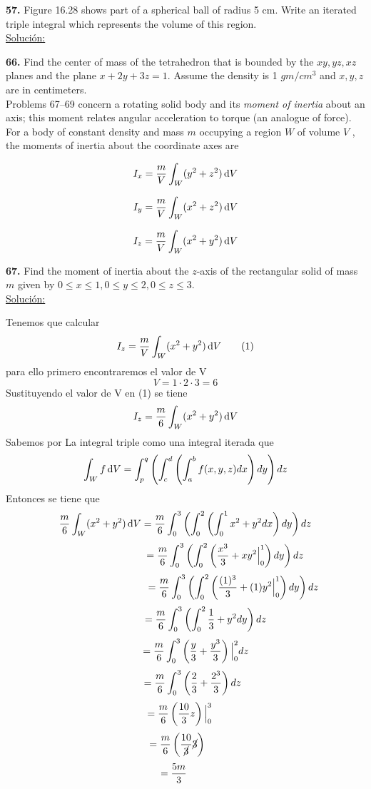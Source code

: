 \documentclass[11pt]{report}
\newcommand{\s}{\underline{Soluci\'{o}n:}}
\begin{document}
\textbf{57.} Figure 16.28 shows part of a spherical ball of radius 5 cm.
Write an iterated triple integral which represents the volume of this region. \\
\s

\textbf{66.} Find the center of mass of the tetrahedron that is bounded by the
$xy, yz, xz$ planes and the plane $x + 2y + 3z = 1$. Assume the density is
1 $gm/cm^3$ and $x, y, z$ are in centimeters. \\

Problems 67–69 concern a rotating solid body and its \textit{moment of inertia}
about an axis; this moment relates angular acceleration to torque (an analogue
of force). For a body of constant density and mass $m$ occupying a region $W$
of volume $V$ , the moments of inertia about the coordinate axes are

\[I_x = \frac{m}{V} \int _W (y^2 + z^2) \, \text d V \]

\[I_y = \frac{m}{V} \int _W (x^2 + z^2) \, \text d V \]

\[I_z = \frac{m}{V} \int _W (x^2 + y^2) \, \text d V \]

\textbf{67.} Find the moment of inertia about the $z$-axis of the rectangular
solid of mass $m$ given by $0 \leq x \leq 1, 0 \leq y \leq 2, 0 \leq z \leq 3$. \\

\s

Tenemos que calcular
\[I_z = \frac{m}{V} \int _W (x^2 + y^2) \, \text d V \qquad (1) \]
para ello primero encontraremos el valor de V
\[V = 1 \cdot 2 \cdot 3 = 6 \]
Sustituyendo el valor de V en (1) se tiene
\[I_z = \frac{m}{6} \int _W (x^2 + y^2) \, \text d V\]
Sabemos por La integral triple como una integral iterada que
\[\int _W f \, \text d V = \int^{q}_{p}\left(\int^{d}_{c}\left(\int^{b}_{a}f(x,y,z) dx \right)dy \right)dz\]
Entonces se tiene que
\[\frac{m}{6} \int _W (x^2 + y^2) \, \text d V = \frac{m}{6}\int^{3}_{0}\left(\int^{2}_{0}\left(\int^{1}_{0}x^2 + y^2 dx \right)dy \right)dz \]
\[\hspace{2.8cm} = \frac{m}{6}\int^{3}_{0}\left(\int^{2}_{0}\left(\frac{x^3}{3} + xy^2\Big|^{1}_{0}\right)dy \right)dz \]
\[\hspace{3.4cm}  = \frac{m}{6}\int^{3}_{0}\left(\int^{2}_{0}\left(\frac{(1)^3}{3} + (1)y^2\Big|^{1}_{0}\right)dy \right)dz\]
\[\hspace{1.45cm}= \frac{m}{6}\int^{3}_{0}\left(\int^{2}_{0}\frac{1}{3} + y^2 dy \right)dz\]
\[\hspace{0.75cm}= \frac{m}{6}\int^{3}_{0}\left(\frac{y}{3} + \frac{y^3}{3}\right)\Big|^{2}_{0}dz \]
\[\hspace{0.5cm}= \frac{m}{6}\int^{3}_{0}\left(\frac{2}{3} + \frac{2^3}{3}\right)dz \]
\[\hspace{-0.4cm}= \frac{m}{6}\left(\frac{10}{3}z \right)\Big|^{3}_{0}\]
\[\hspace{-0.6cm}= \frac{m}{6}\left(\frac{10}{\cancel{3}}\cancel{3}\right)\]
\[\hspace{-0.8cm}= \frac{5m}{3}\]
\end{document}
